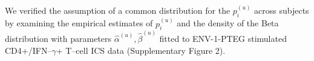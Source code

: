 \documentclass[12pt,oupdraft]{biostatistics}
\begin{document}

We verified the assumption of a common distribution for the $p^{(u)}_{i}$
across subjects by examining the empirical estimates of $p^{(u)}_{i}$ and the
density of the Beta distribution with parameters $\hat{\alpha}^{(u)},
\hat{\beta}^{(u)}$ fitted to ENV-1-PTEG stimulated
CD4+/IFN--$\gamma$+ T--cell ICS data (Supplementary Figure 2).
\end{document}
